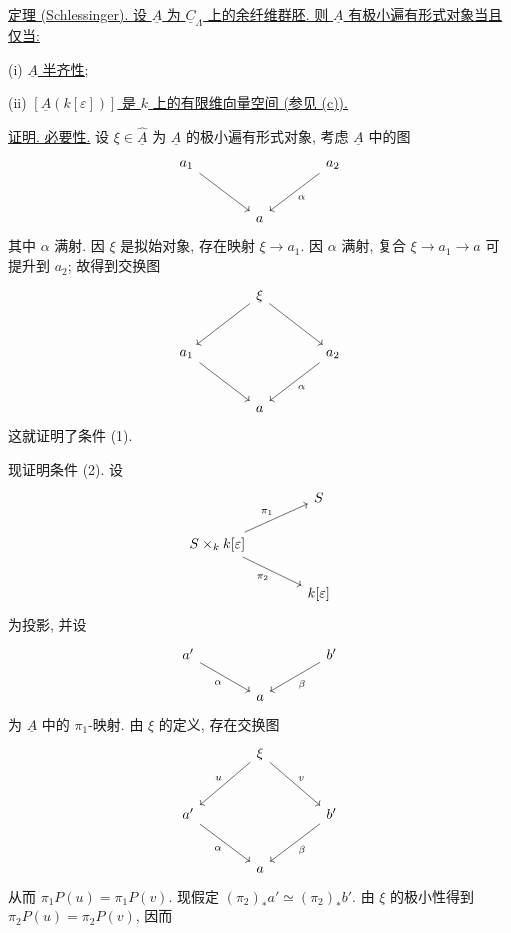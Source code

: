 
\underline{定理  (Schlessinger).
设 $\underline A$ 为 $\underline C_\Lambda$ 上的余纤维群胚.
则 $\underline A$ 有极小遍有形式对象当且仅当:}


(i) \underline{$\underline A$ 半齐性;}

(ii) \underline{$[\underline A(k[\varepsilon])]$ 是 $k$ 上的有限维向量空间
(参见 (c)).}

\underline{证明. 必要性.}
设 $\xi\in\widehat{\underline A}$ 为 $\underline A$ 的极小遍有形式对象,
考虑 $\underline A$ 中的图
\[
\begin{tikzcd}[column sep=large,row sep=large]
a_1 \arrow[dr] & & a_2 \arrow[dl,"\alpha"] \\
& a &
\end{tikzcd}
\]
其中 $\alpha$ 满射. 因 $\xi$ 是拟始对象, 存在映射 $\xi\longrightarrow a_1$.
因 $\alpha$ 满射, 复合 $\xi\longrightarrow a_1\longrightarrow a$ 可提升到 $a_2$;
故得到交换图
\[
\begin{tikzcd}[column sep=large,row sep=large]
& \xi \arrow[dl] \arrow[dr] & \\
a_1 \arrow[dr] & & a_2 \arrow[dl,"\alpha"] \\
& a &
\end{tikzcd}
\]
这就证明了条件 (1).

现证明条件 (2). 设
\[
\begin{tikzcd}[column sep=large]
& S \\
S\times_k k[\varepsilon]
 \arrow[ur,"\pi_1"] \arrow[dr,"\pi_2"'] & \\
& k[\varepsilon]
\end{tikzcd}
\]
为投影, 并设
\[
\begin{tikzcd}[column sep=large]
a' \arrow[dr,"\alpha"'] & & b' \arrow[dl,"\beta"] \\
& a &
\end{tikzcd}
\]
为 $\underline A$ 中的 $\pi_1$-映射. 由 $\xi$ 的定义, 存在交换图
\[
\begin{tikzcd}[column sep=large,row sep=large]
& \xi \arrow[dl,"u"'] \arrow[dr,"v"] & \\
a' \arrow[dr,"\alpha"'] & & b' \arrow[dl,"\beta"] \\
& a &
\end{tikzcd}
\]
从而 $\pi_1P(u)=\pi_1P(v)$. 现假定 $(\pi_2)_*a'\simeq(\pi_2)_*b'$.
由 $\xi$ 的极小性得到 $\pi_2P(u)=\pi_2P(v)$, 因而

